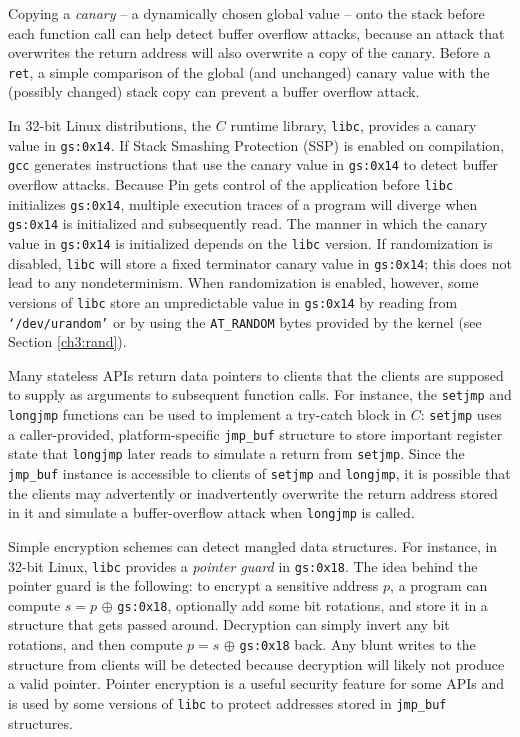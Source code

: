  \newline
Copying a \emph{canary} -- a dynamically chosen global value -- onto the
stack before each function call can help detect buffer overflow attacks, because 
an attack that overwrites the return address will also overwrite
a copy of the canary. Before a \texttt{ret}, a simple comparison 
of the global (and unchanged) canary
value with the (possibly changed) stack copy can prevent a buffer overflow attack.

In 32-bit Linux distributions, the $C$ runtime library, 
\texttt{libc}, provides a canary value in \texttt{gs:0x14}.
If Stack Smashing Protection (SSP) is enabled on compilation,
\texttt{gcc} generates instructions that use the canary value
in \texttt{gs:0x14} to detect buffer overflow attacks.
Because Pin gets control of the application before \texttt{libc}
initializes \texttt{gs:0x14}, multiple execution traces of a program
will diverge when \texttt{gs:0x14} is initialized and subsequently
read.  The manner in which the canary value in \texttt{gs:0x14} is initialized
depends on the \texttt{libc} version.
If randomization is disabled, \texttt{libc} will store a fixed
terminator canary value in \texttt{gs:0x14}; this does not lead to any nondeterminism.
When randomization is enabled, however,  
some versions of \texttt{libc} store an unpredictable value in \texttt{gs:0x14} 
by reading from \texttt{`/dev/urandom'}
or by using the \texttt{AT\_RANDOM} bytes provided by the kernel (see
Section \ref{ch3:rand}). 

\newpage
{} \newline
Many stateless APIs return data pointers to clients 
that the clients are supposed to supply as arguments
to subsequent function calls. 
For instance, the \texttt{setjmp} and \texttt{longjmp} functions
can be used to implement a try-catch block in $C$: \texttt{setjmp} uses 
a caller-provided, platform-specific \texttt{jmp\_buf} structure
to store important register state that \texttt{longjmp} 
later reads to simulate a return from \texttt{setjmp}.
Since the \texttt{jmp\_buf} instance is accessible to clients of \texttt{setjmp}
and \texttt{longjmp}, it is possible that the clients may advertently or inadvertently
overwrite the return address stored in it and simulate a buffer-overflow attack
when \texttt{longjmp} is called.

Simple encryption schemes can detect mangled data structures.
For instance, in 32-bit Linux, \texttt{libc} provides
a {\em pointer guard}  in \texttt{gs:0x18}. 
The idea behind the pointer guard is the following: 
to encrypt a sensitive address $p$, a program
can compute $s = p$  $\oplus  $ \texttt{gs:0x18}, 
optionally add some bit rotations, and store it in a structure
that gets passed around. Decryption can simply invert any bit rotations, 
and then compute $p = s$ $\oplus  $ \texttt{gs:0x18} back. 
Any blunt writes to the structure from clients will be detected because
decryption will likely not produce a valid pointer. 
Pointer encryption is a useful security feature for some APIs
and is used by some versions of \texttt{libc} to protect addresses stored in \texttt{jmp\_buf}
structures.

